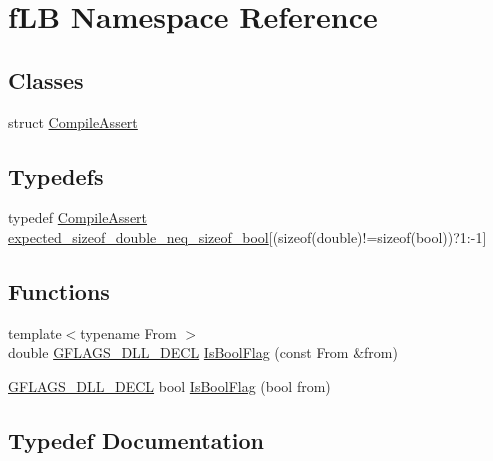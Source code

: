 \hypertarget{namespacefLB}{}\section{f\+LB Namespace Reference}
\label{namespacefLB}
\subsection*{Classes}
\begin{DoxyCompactItemize}
\item 
struct \hyperlink{structfLB_1_1CompileAssert}{Compile\+Assert}
\end{DoxyCompactItemize}
\subsection*{Typedefs}
\begin{DoxyCompactItemize}
\item 
typedef \hyperlink{structfLB_1_1CompileAssert}{Compile\+Assert} \hyperlink{namespacefLB_a7d56a9d0f4f81256b3c15a6308300dab}{expected\+\_\+sizeof\+\_\+double\+\_\+neq\+\_\+sizeof\+\_\+bool}\mbox{[}(sizeof(double)!=sizeof(bool))?1\+:-\/1\mbox{]}
\end{DoxyCompactItemize}
\subsection*{Functions}
\begin{DoxyCompactItemize}
\item 
{\footnotesize template$<$typename From $>$ }\\double \hyperlink{gflags__declare_8h_ab630d48e0b993f39ca96b0c4401f01cf}{G\+F\+L\+A\+G\+S\+\_\+\+D\+L\+L\+\_\+\+D\+E\+CL} \hyperlink{namespacefLB_a44b10cd752a6c2d26e2f3cf1681ce9a3}{Is\+Bool\+Flag} (const From \&from)
\item 
\hyperlink{gflags__declare_8h_ab630d48e0b993f39ca96b0c4401f01cf}{G\+F\+L\+A\+G\+S\+\_\+\+D\+L\+L\+\_\+\+D\+E\+CL} bool \hyperlink{namespacefLB_a467c1bc95ab8e3d9f035be7f3af1a822}{Is\+Bool\+Flag} (bool from)
\end{DoxyCompactItemize}


\subsection{Typedef Documentation}
